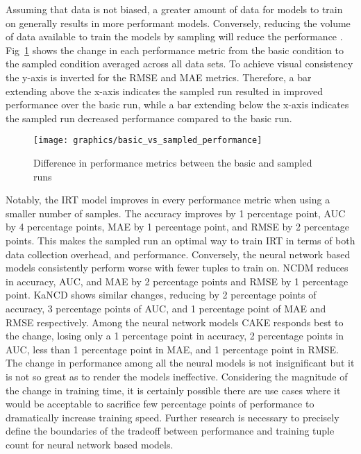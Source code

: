 \documentclass[letterpaper, 12pt, captions=tableabove]{scrreprt}
\begin{document}
		Assuming that data is not biased, a greater amount of data for models to train on generally results in more performant models. Conversely, reducing the volume of data available to train the models by sampling will reduce the performance \cite{bengio2017}. Fig~\ref{fig:basicVsSampledPerformance} shows the change in each performance metric from the basic condition to the sampled condition averaged across all data sets. To achieve visual consistency the y-axis is inverted for the RMSE and MAE metrics. Therefore, a bar extending above the x-axis indicates the sampled run resulted in improved performance over the basic run, while a bar extending below the x-axis indicates the sampled run decreased performance compared to the basic run. 

		\begin{figure}[htbp]
			\centering
			\texttt{[image: graphics/basic\_vs\_sampled\_performance]}
			\captionsetup{justification=centering}
			\caption{Difference in performance metrics between the basic and sampled runs}
			\label{fig:basicVsSampledPerformance}
		\end{figure}

		Notably, the IRT model improves in every performance metric when using a smaller number of samples. The accuracy improves by 1 percentage point, AUC by 4 percentage points, MAE by 1 percentage point, and RMSE by 2 percentage points. This makes the sampled run an optimal way to train IRT in terms of both data collection overhead, and performance. Conversely, the neural network based models consistently perform worse with fewer tuples to train on. NCDM reduces in accuracy, AUC, and MAE by 2 percentage points and RMSE by 1 percentage point. KaNCD shows similar changes, reducing by 2 percentage points of accuracy, 3 percentage points of AUC, and 1 percentage point of MAE and RMSE respectively. Among the neural network models CAKE responds best to the change, losing only a 1 percentage point in accuracy, 2 percentage points in AUC, less than 1 percentage point in MAE, and 1 percentage point in RMSE. The change in performance among all the neural models is not insignificant but it is not so great as to render the models ineffective. Considering the magnitude of the change in training time, it is certainly possible there are use cases where it would be acceptable to sacrifice few percentage points of performance to dramatically increase training speed. Further research is necessary to precisely define the boundaries of the tradeoff between performance and training tuple count for neural network based models.
		
\end{document}
